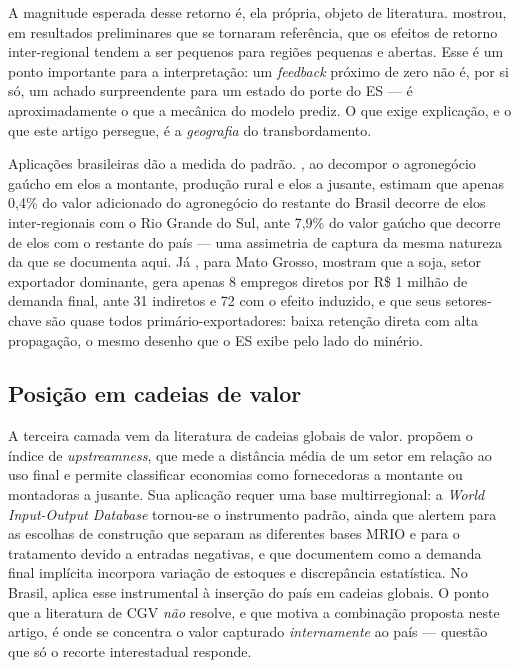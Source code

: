 \documentclass[11pt,a4paper]{article}
\begin{document}
A magnitude esperada desse retorno é, ela própria, objeto de literatura.
\citet{miller1966} mostrou, em resultados preliminares que se tornaram
referência, que os efeitos de retorno inter-regional tendem a ser pequenos
para regiões pequenas e abertas. Esse é um ponto importante para a
interpretação: um \emph{feedback} próximo de zero não é, por si só, um achado
surpreendente para um estado do porte do ES --- é aproximadamente o que a
mecânica do modelo prediz. O que exige explicação, e o que este artigo
persegue, é a \emph{geografia} do transbordamento.

Aplicações brasileiras dão a medida do padrão. \citet{peixoto2013metodologia},
ao decompor o agronegócio gaúcho em elos a montante, produção rural e elos a
jusante, estimam que apenas 0,4\% do valor adicionado do agronegócio do
restante do Brasil decorre de elos inter-regionais com o Rio Grande do Sul,
ante 7,9\% do valor gaúcho que decorre de elos com o restante do país --- uma
assimetria de captura da mesma natureza da que se documenta aqui. Já
\citet{figueiredo2004agriculture}, para Mato Grosso, mostram que a soja, setor
exportador dominante, gera apenas 8 empregos diretos por R\$ 1 milhão de
demanda final, ante 31 indiretos e 72 com o efeito induzido, e que seus
setores-chave são quase todos primário-exportadores: baixa retenção direta com
alta propagação, o mesmo desenho que o ES exibe pelo lado do minério.

\subsection{Posição em cadeias de valor}
A terceira camada vem da literatura de cadeias globais de valor.
\citet{antras2012measuring} propõem o índice de \emph{upstreamness}, que mede
a distância média de um setor em relação ao uso final e permite classificar
economias como fornecedoras a montante ou montadoras a jusante. Sua aplicação
requer uma base multirregional: a \emph{World Input-Output Database}
\citep{timmer2015wiod} tornou-se o instrumento padrão, ainda que
\citet{tukker2013global} alertem para as escolhas de construção que separam as
diferentes bases MRIO e para o tratamento devido a entradas negativas, e que
\citet{oecd2019tiva} documentem como a demanda final implícita incorpora
variação de estoques e discrepância estatística. No Brasil,
\citet{araujojunior2018cgv} aplica esse instrumental à inserção do país em
cadeias globais. O ponto que a literatura de CGV \emph{não} resolve, e que
motiva a combinação proposta neste artigo, é onde se concentra o valor
capturado \emph{internamente} ao país --- questão que só o recorte
interestadual responde.
\end{document}
